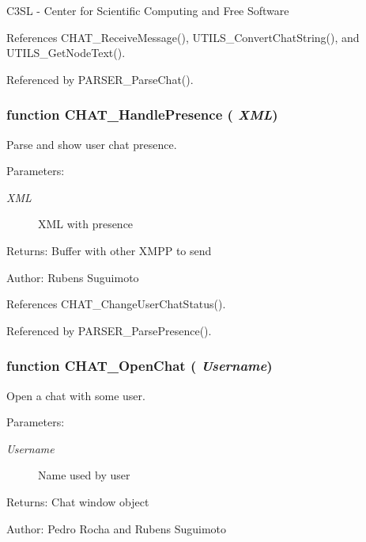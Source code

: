 C3SL - Center for Scientific Computing and Free Software 

References CHAT\_\-ReceiveMessage(), UTILS\_\-ConvertChatString(), and UTILS\_\-GetNodeText().

Referenced by PARSER\_\-ParseChat().
\subsubsection[CHAT\_\-HandlePresence]{\setlength{\rightskip}{0pt plus 5cm}function CHAT\_\-HandlePresence ( {\em XML})}\label{chat_2chat_8js_c171e94a428c2f9d1f04070f69287d0c}


Parse and show user chat presence. 

\begin{Desc}
\item[Parameters:]
\begin{description}
\item[{\em XML}]XML with presence \end{description}
\end{Desc}
\begin{Desc}
\item[Returns:]Buffer with other XMPP to send \end{Desc}
\begin{Desc}
\item[Author:]Rubens Suguimoto \end{Desc}


References CHAT\_\-ChangeUserChatStatus().

Referenced by PARSER\_\-ParsePresence().
\subsubsection[CHAT\_\-OpenChat]{\setlength{\rightskip}{0pt plus 5cm}function CHAT\_\-OpenChat ( {\em Username})}\label{chat_2chat_8js_9750e8d94926a232f70cfac576e96850}


Open a chat with some user. 

\begin{Desc}
\item[Parameters:]
\begin{description}
\item[{\em Username}]Name used by user \end{description}
\end{Desc}
\begin{Desc}
\item[Returns:]Chat window object \end{Desc}
\begin{Desc}
\item[Author:]Pedro Rocha and Rubens Suguimoto \end{Desc}


